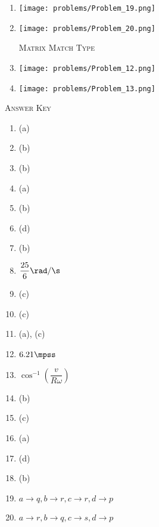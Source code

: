\documentclass[11pt]{article}
\begin{document}
\begin{enumerate}
\item \texttt{[image: problems/Problem\_19.png]}
\item \texttt{[image: problems/Problem\_20.png]}


    \begin{center}
        \textsc{Matrix Match Type}
    \end{center}

   \item \texttt{[image: problems/Problem\_12.png]}
   \item \texttt{[image: problems/Problem\_13.png]}
    
    
    

\end{enumerate}



\vspace*{\fill}
\begin{center}
    \textsc{Answer Key}
\end{center}
\begin{multicols}{3}
\begin{enumerate}
    \item (a)
    \item (b)
    \item (b)
    \item (a)
    \item (b)
    \item (d)
    \item (b)
    \item $\dfrac{25}{6}\rad/\s$
    \item (c)
    \item (c)
    \item (a), (c)
    \item $6.21\mpss$
    \item $\cos^{-1}\left(\dfrac{v}{R\omega}\right)$
    \item (b)
    \item (c)
    \item (a)
    \item (d)
    \item (b)
    \item $a\rightarrow q, b \rightarrow r, c \rightarrow r, d\rightarrow p$
    \item $a\rightarrow r, b \rightarrow q, c \rightarrow s, d\rightarrow p$
\end{enumerate}
\end{multicols}


% 

\end{document}
